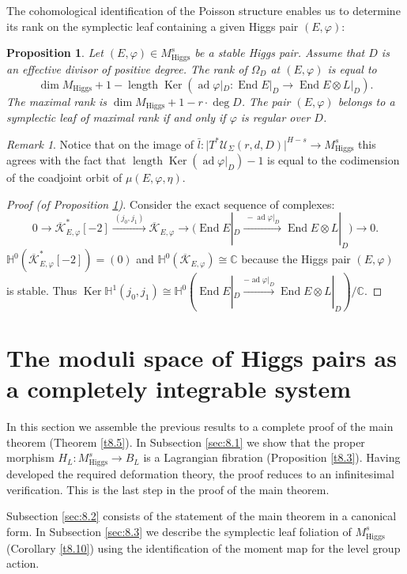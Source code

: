 \documentclass[12pt,a4paper,oneside,english]{smfart}
\newtheorem{prop}[thm]{Proposition}
\theoremstyle{definition}
\theoremstyle{remark}
\newtheorem{rem}[thm]{Remark}
\DeclareMathOperator{\End}{End}
\DeclareMathOperator{\ad}{ad}
\DeclareMathOperator{\length}{length}
\DeclareMathOperator{\Ker}{Ker}
\newcommand{\Hig}{\mathrm{Higgs}}
\newcommand{\MH}{M_{\Hig}}
\newcommand{\MHs}{M^{s}_{\Hig}}
\newcommand{\cU}{\mathcal{U}}
\newcommand{\KK}{\mathscr{K}}
\newcommand{\HH}{\mathbb{H}}
\newcommand{\lbar}{\bar{l}}
\newcommand{\tot}[1]{\lvert #1 \rvert}
\begin{document}
The cohomological identification of the Poisson structure enables us to determine its rank on the symplectic leaf containing a given Higgs pair $(E, \varphi)$:

\begin{prop}\label{t7.17}
Let $(E, \varphi) \in \MHs$ be a stable Higgs pair. Assume that $D$ is an effective divisor of positive degree. The rank of $\Omega_D$ at $(E, \varphi)$ is equal to
\[
\dim \MH + 1 - \length \Ker(\ad \varphi|_D \colon \End E|_D \to \End E \otimes L|_D).
\]
The maximal rank is $\dim \MH + 1 - r \cdot \deg D$. The pair $(E, \varphi)$ belongs to a symplectic leaf of maximal rank if and only if $\varphi$ is regular over $D$.
\end{prop}

\begin{rem}\label{t7.18}
Notice that on the image of $\lbar \colon \tot{T^*\cU_\Sigma(r, d, D)}^{H-s} \to \MHs$ this agrees with the fact that $\length \Ker(\ad \varphi|_D) - 1$ is equal to the codimension of the coadjoint orbit of $\mu(E, \varphi, \eta)$.
\end{rem}

\begin{proof}[Proof (of Proposition \ref{t7.17})]
Consider the exact sequence of complexes:
\[
0 \to \overline{\KK}^*_{E, \varphi}[-2] \xrightarrow{\ (j_0, j_1)\ } \overline{\KK}_{E, \varphi} \to \bigl(\End E|_D \xrightarrow{\ -\ad \varphi|_D\ } \End E \otimes L|_D\bigr) \to 0.
\]
$\HH^0(\overline{\KK}^*_{E, \varphi}[-2]) = (0)$ and $\HH^0(\overline{\KK}_{E, \varphi}) \cong \mathbb{C}$ because the Higgs pair $(E, \varphi)$ is stable. Thus $\Ker \HH^1(j_0, j_1) \cong \HH^0(\End E|_D \xrightarrow{-\ad \varphi|_D} \End E \otimes L|_D)/\mathbb{C}$.
\end{proof}

\section{The moduli space of Higgs pairs as a completely integrable system}\label{sec:8}

In this section we assemble the previous results to a complete proof of the main theorem (Theorem \ref{t8.5}). In Subsection \ref{sec:8.1} we show that the proper morphism $H_L \colon \MHs \to B_L$ is a Lagrangian fibration (Proposition \ref{t8.3}). Having developed the required deformation theory, the proof reduces to an infinitesimal verification. This is the last step in the proof of the main theorem.

Subsection \ref{sec:8.2} consists of the statement of the main theorem in a canonical form. In Subsection \ref{sec:8.3} we describe the symplectic leaf foliation of $\MHs$ (Corollary \ref{t8.10}) using the identification of the moment map for the level group action.
\end{document}
